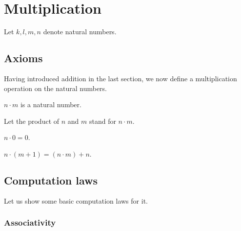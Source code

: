 \documentclass[../../arithmetic.ftl.tex]{subfiles}
\begin{document}
  \section{Multiplication}

  \begin{forthel}
  \end{forthel}

  \begin{forthel}
    Let $k, l, m, n$ denote natural numbers.
  \end{forthel}


  \subsection{Axioms}

  Having introduced addition in the last section, we now define a multiplication
  operation on the natural numbers.

  \begin{forthel}
    \begin{signature}
      $n \cdot m$ is a natural number.
    \end{signature}

    Let the product of $n$ and $m$ stand for $n \cdot m$.

    \begin{axiom}\label{Arithmetic_01_03_374176}
      $n \cdot 0 = 0$.
    \end{axiom}

    \begin{axiom}\label{Arithmetic_01_03_667207}
      $n \cdot (m + 1) = (n \cdot m) + n$.
    \end{axiom}
  \end{forthel}


  \subsection{Computation laws}

  Let us show some basic computation laws for it.


  \subsubsection*{Associativity}
\end{document}
